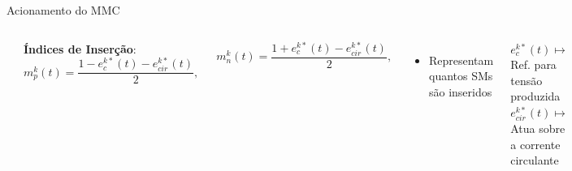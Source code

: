 \begin{frame}{Acionamento do MMC}

\begin{columns}
\centering
\includegraphics[width=0.9\linewidth]{./figuras/figuras_MMC/MMC_blk}


\textbf{Índices de Inserção}:
\begin{equation*}
m_{p}^{k}(t) = \frac{1 - e_c^{k*}(t) - e_{cir}^{k*}(t)}{2},
\end{equation*}

\begin{equation*}
m_{n}^{k}(t) = \frac{1 + e_c^{k*}(t) - e_{cir}^{k*}(t)}{2},
\end{equation*}   

\begin{itemize}
	\item Representam quantos SMs são inseridos
\end{itemize}


$e_c^{k*}(t) \mapsto$ Ref. para tensão produzida\\[10pt]


$e_{cir}^{k*}(t)\mapsto$ Atua sobre a corrente circulante

\end{columns}

\end{frame}


